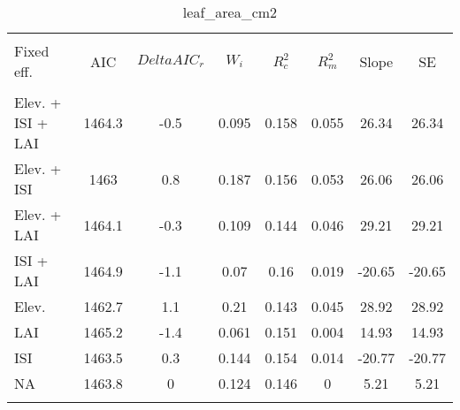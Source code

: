 
\begin{table}[!htbp] \centering 
  \caption{leaf_area_cm2} 
  \label{leaf_area_cm2} 
\begin{tabular}{@{\extracolsep{5pt}} lS[table-format=3.2]S[table-format=3.2]S[table-format=3.2]S[table-format=3.2]S[table-format=3.2]S[table-format=3.2]S[table-format=3.2]} 
\\[-1.8ex]\hline 
\hline \\[-1.8ex] 
{Fixed eff.} & {AIC} & {$Delta{}AIC_r$} & {$W_i$} & {$R^2_c$} & {$R^2_m$} & {Slope} & {SE} \\
\hline \\[-1.8ex] 
Elev. + ISI + LAI & 1464.3 & -0.5 & 0.095 & 0.158 & 0.055 & 26.34 & 26.34 \\ 
Elev. + ISI & 1463 & 0.8 & 0.187 & 0.156 & 0.053 & 26.06 & 26.06 \\ 
Elev. + LAI & 1464.1 & -0.3 & 0.109 & 0.144 & 0.046 & 29.21 & 29.21 \\ 
ISI + LAI & 1464.9 & -1.1 & 0.07 & 0.16 & 0.019 & -20.65 & -20.65 \\ 
Elev. & 1462.7 & 1.1 & 0.21 & 0.143 & 0.045 & 28.92 & 28.92 \\ 
LAI & 1465.2 & -1.4 & 0.061 & 0.151 & 0.004 & 14.93 & 14.93 \\ 
ISI & 1463.5 & 0.3 & 0.144 & 0.154 & 0.014 & -20.77 & -20.77 \\ 
NA & 1463.8 & 0 & 0.124 & 0.146 & 0 & 5.21 & 5.21 \\ 
\hline \\[-1.8ex] 
\end{tabular} 
\end{table} 
